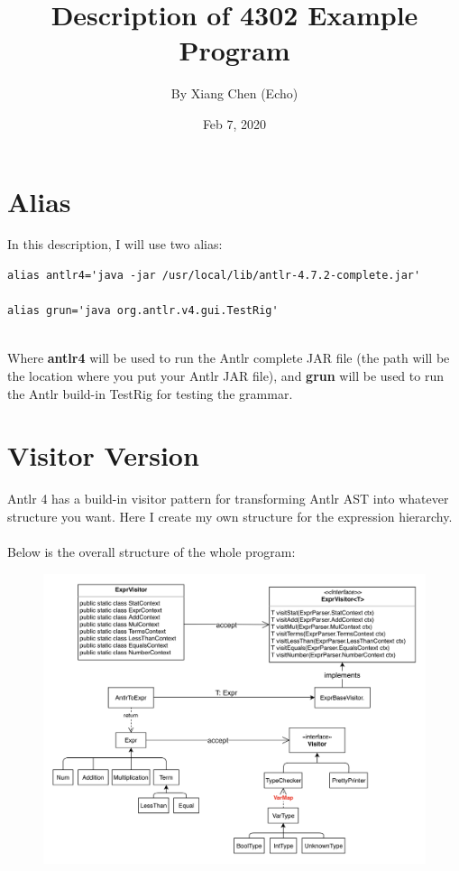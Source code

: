 \documentclass[a4paper,12pt,titlepage]{article}
\begin{document}
\title{\Large{\textbf{Description of 4302 Example Program}}}
\author{By Xiang Chen (Echo)}
\date{Feb 7, 2020}
\maketitle
\tableofcontents
\newpage

\section {Alias}
In this description, I will use two alias:
\begin{lstlisting}
alias antlr4='java -jar /usr/local/lib/antlr-4.7.2-complete.jar'

alias grun='java org.antlr.v4.gui.TestRig'
\end{lstlisting}
~\\
Where {\bf antlr4} will be used to run the Antlr complete JAR file (the path will be the location where you put your Antlr JAR file), and {\bf grun} will be used to run the Antlr build-in TestRig for testing the grammar.

\section{Visitor Version}
Antlr 4 has a build-in visitor pattern for transforming Antlr AST into whatever structure you want. Here I create my own structure for the expression hierarchy.
\\
\\
Below is the overall structure of the whole program:
\begin{figure}[H]
\centering
\includegraphics[width=\linewidth]{4302visitor.jpg}
\end{figure}
\end{document}
